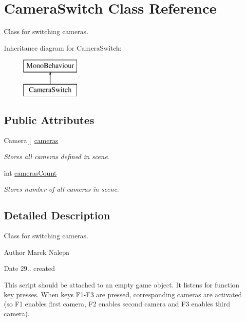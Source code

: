 \hypertarget{class_camera_switch}{}\section{Camera\+Switch Class Reference}
\label{class_camera_switch}


Class for switching cameras.  


Inheritance diagram for Camera\+Switch\+:\begin{figure}[H]
\begin{center}
\leavevmode
\includegraphics[height=2.000000cm]{class_camera_switch}
\end{center}
\end{figure}
\subsection*{Public Attributes}
\begin{DoxyCompactItemize}
\item 
Camera\mbox{[}$\,$\mbox{]} \hyperlink{class_camera_switch_a4797769d49b74b29a261aa81c820b25d}{cameras}
\begin{DoxyCompactList}\small\item\em Stores all cameras defined in scene. \end{DoxyCompactList}\item 
int \hyperlink{class_camera_switch_a61b4cf53f1fc86e226eefdb6685ab777}{cameras\+Count}
\begin{DoxyCompactList}\small\item\em Stores number of all cameras in scene. \end{DoxyCompactList}\end{DoxyCompactItemize}


\subsection{Detailed Description}
Class for switching cameras. 

\begin{DoxyAuthor}{Author}
Marek Nalepa 
\end{DoxyAuthor}
\begin{DoxyDate}{Date}
29.. created
\end{DoxyDate}
This script should be attached to an empty game object. It listens for function key presses. When keys F1-\/\+F3 are pressed, corresponding cameras are activated (so F1 enables first camera, F2 enables second camera and F3 enables third camera). 

